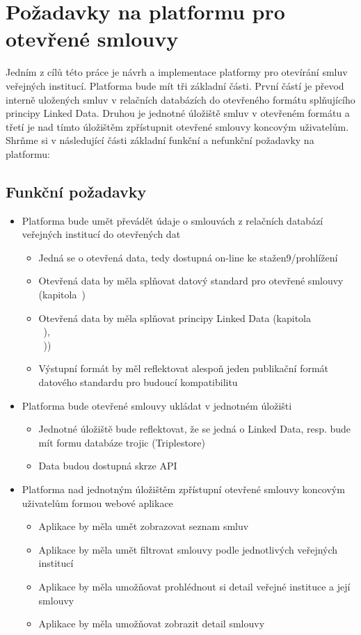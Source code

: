 \chapter{Požadavky na platformu pro otevřené smlouvy}
\label{sec:kap5}

Jedním z cílů této práce je návrh a implementace platformy pro otevírání smluv veřejných institucí. Platforma bude mít tři základní části. První částí je převod interně uložených smluv v relačních databázích do otevřeného formátu splňujícího principy Linked Data. Druhou je jednotné úložiště smluv v otevřeném formátu a třetí je nad tímto úložištěm zpřístupnit otevřené smlouvy koncovým uživatelům. Shrňme si v následující části základní funkční a nefunkční požadavky na platformu: 

\section{Funkční požadavky}

\begin{itemize}
\item Platforma bude umět převádět údaje o smlouvách z relačních databází veřejných institucí do otevřených dat
	\begin{itemize}
	\item Jedná se o otevřená data, tedy dostupná on-line ke stažen9/prohlížení
	\item Otevřená data by měla splňovat datový standard pro otevřené smlouvy (kapitola~)
	\item Otevřená data by měla splňovat principy Linked Data (kapitola\\~),\\~))
	\item Výstupní formát by měl reflektovat alespoň jeden publikační formát datového standardu pro budoucí kompatibilitu
	\end{itemize}
\item Platforma bude otevřené smlouvy ukládat v jednotném úložišti
	\begin{itemize}
	\item Jednotné úložiště bude reflektovat, že se jedná o Linked Data, resp. bude mít formu databáze trojic (Triplestore)
	\item Data budou dostupná skrze API
	\end{itemize}
\item Platforma nad jednotným úložištěm zpřístupní otevřené smlouvy koncovým uživatelům formou webové aplikace
	\begin{itemize}
	\item Aplikace by měla umět zobrazovat seznam smluv
	\item Aplikace by měla umět filtrovat smlouvy podle jednotlivých veřejných institucí
	\item Aplikace by měla umožňovat prohlédnout si detail veřejné instituce a její smlouvy
	\item Aplikace by měla umožňovat zobrazit detail smlouvy 
	\end{itemize}
\end{itemize}

